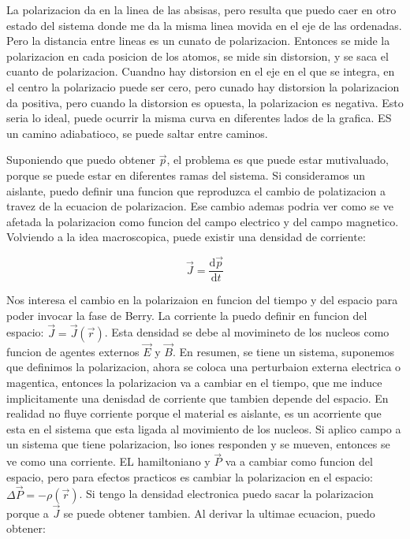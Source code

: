 \documentclass[11pt,fleqn]{book}
\begin{document}
La polarizacion da en la linea de las absisas, pero resulta que puedo caer en otro estado del sistema donde me da la misma linea movida en el eje de las ordenadas. Pero la distancia entre lineas es un cunato de polarizacion. Entonces se mide la polarizacion en cada posicion de los atomos, se mide sin distorsion, y se saca el cuanto de polarizacion.  Cuandno hay distorsion en el eje en el que se integra, en el centro la polarizacio puede ser cero, pero cunado hay distorsion la polarizacion da positiva, pero cuando la distorsion es opuesta, la polarizacion es negativa. Esto seria lo ideal, puede ocurrir la misma curva en diferentes lados de la grafica. ES un camino adiabatioco, se puede saltar entre caminos.

Suponiendo que puedo obtener $\vec{p}$, el problema es que puede estar mutivaluado, porque se puede estar en diferentes ramas del sistema. Si consideramos un aislante, puedo definir una funcion que reproduzca el cambio de polatizacion a travez de la ecuacion de polarizacion. Ese cambio ademas podria ver como se ve afetada la polarizacion como  funcion del campo electrico y del campo magnetico. Volviendo a la idea macroscopica, puede existir una densidad de corriente:

\begin{equation}
    \vec{J}=\frac{\mathrm{d}\vec{p}}{\mathrm{d}t}
\end{equation}

Nos interesa el cambio en la polarizaion en funcion del tiempo y del espacio para poder invocar la fase de Berry. La corriente la puedo definir en funcion del espacio: $\vec{J}=\vec{J}(\vec{r})$. Esta densidad se debe al movimineto de los nucleos como funcion de agentes externos $\vec{E}$ y $\vec{B}$. En resumen, se tiene un sistema, suponemos que definimos la polarizacion, ahora se coloca una perturbaion externa electrica  o magentica, entonces la polarizacion va a cambiar en el tiempo, que me induce implicitamente una denisdad de corriente que tambien depende del espacio. En realidad no fluye corriente porque el material es aislante, es un acorriente que esta en el sistema que esta ligada al movimiento de los nucleos. Si aplico campo a un sistema que tiene polarizacion, lso iones responden y se mueven, entonces se ve como una corriente. EL hamiltoniano y $\vec{P}$ va a cambiar como funcion del espacio, pero para efectos practicos es cambiar la polarizacion en el espacio: $\Delta\vec{P}=-\rho(\vec{r})$. Si tengo la densidad electronica puedo sacar la polarizacion porque a $\vec{J}$ se puede obtener tambien. Al derivar la ultimae ecuacion, puedo obtener:
\end{document}
